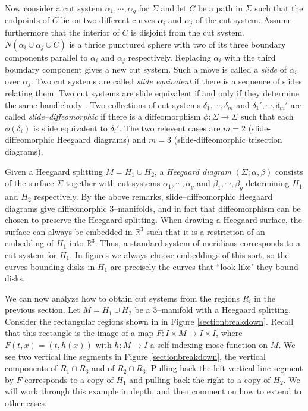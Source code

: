 \documentclass[12pt]{amsart}
\newcommand{\R}{\mathbb{R}}
\theoremstyle{definition}
\theoremstyle{remark}
\begin{document}
Now consider a cut system $\alpha_1,\cdots,\alpha_g$ for $\Sigma$ and let $C$ be a path in $\Sigma$ such that the endpoints of $C$ lie on two different curves $\alpha_i$ and $\alpha_j$ of the cut system.
Assume furthermore that the interior of $C$ is disjoint from the cut system.
$N(\alpha_i \cup \alpha_j \cup C)$ is a thrice punctured sphere with two of its three boundary components parallel to $\alpha_i$ and $\alpha_j$ respectively.
Replacing $\alpha_i$ with the third boundary component gives a new cut system.
Such a move is called a \emph{slide} of $\alpha_i$ over $\alpha_j$.
Two cut systems are called \emph{slide equivalent} if there is a sequence of slides relating them.
Two cut systems are slide equivalent if and only if they determine the same handlebody \cite{Johannson1}.
Two collections of cut systems $\delta_1,\cdots,\delta_m$ and $\delta_1',\cdots,\delta_m'$ are called \emph{slide--diffeomorphic} if there is a diffeomorphism $\phi\colon \Sigma \to \Sigma$ such that each $\phi(\delta_i)$ is slide equivalent to $\delta_i '$.
The two relevent cases are $m=2$ (slide-diffeomorphic Heegaard diagrams) and $m=3$ (slide-diffeomorphic trisection diagrams).

Given a Heegaard splitting $M = H_1 \cup H_2$, a \emph{Heegaard diagram} $(\Sigma; \alpha, \beta)$ consists of the surface $\Sigma$ together with cut systems $\alpha_1,\cdots,\alpha_g$ and $\beta_1,\cdots,\beta_g$ determining $H_1$ and $H_2$ respectively.
By the above remarks, slide--diffeomorphic Heegaard diagrams give diffeomorphic 3--manifolds, and in fact that diffeomorphism can be chosen to preserve the Heegaard splitting.
When drawing a Heegaard surface, the surface can always be embedded in $\R^3$ such that it is a restriction of an embedding of $H_1$ into $\R^3$.
Thus, a standard system of meridians corresponds to a cut system for $H_1$.
In figures we always choose embeddings of this sort, so the curves bounding disks in $H_1$ are precisely the curves that ``look like" they bound disks.

We can now analyze how to obtain cut systems from the regions $R_i$ in the previous section.
Let $M = H_1 \cup H_2$ be a 3--manifold with a Heegaard splitting.
Consider the rectangular regions shown in in Figure \ref{sectionbreakdown}.
Recall that this rectangle is the image of a map $F\colon I \times M \to I \times I$, where $F(t,x) = (t,h(x))$ with $h\colon M \to I$ a self indexing mose function on $M$.
We see two vertical line segments in Figure \ref{sectionbreakdown}, the vertical components of $R_1 \cap R_3$ and of $R_2 \cap R_3$.
Pulling back the left vertical line segment by $F$ corresponds to a copy of $H_1$ and pulling back the right to a copy of $H_2$.
We will work through this example in depth, and then comment on how to extend to other cases.
\end{document}
